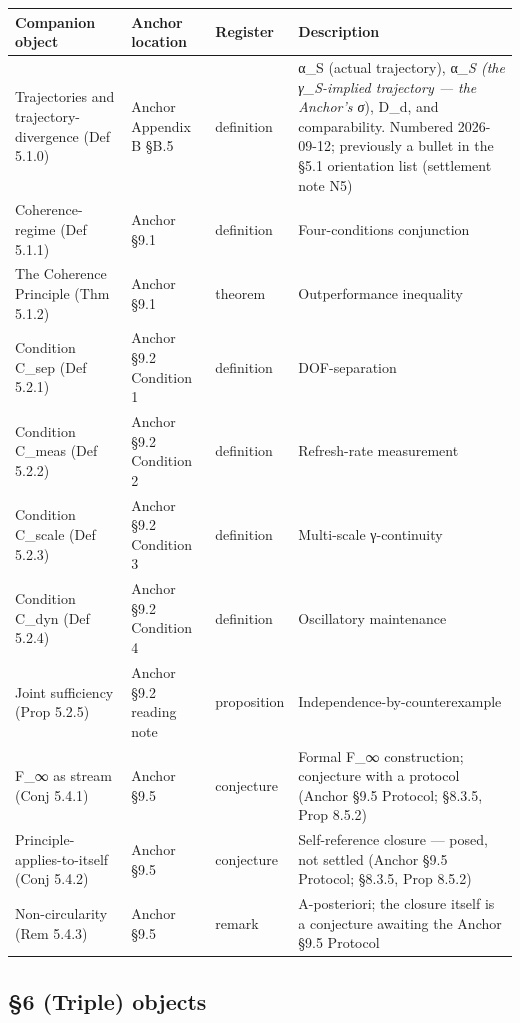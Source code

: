 \documentclass[11pt, openany]{book}
\begin{document}
\begingroup\setlength{\tabcolsep}{3pt}\renewcommand{\arraystretch}{1.15}\footnotesize
\begin{longtable}{p{0.67in} p{0.52in} p{0.52in} p{2.57in}}
\toprule
Companion object & Anchor location & Register & Description \\
\midrule
\endhead
\bottomrule
\endfoot
Trajectories and trajectory-divergence (Def 5.1.0) & Anchor Appendix B §B.5 & definition & α\_\allowbreak{}S (actual trajectory), α\textit{\_\allowbreak{}S (the γ\_\allowbreak{}S-implied trajectory --- the Anchor's σ}), D\_\allowbreak{}d, and comparability. Numbered 2026-09-12; previously a bullet in the §5.1 orientation list (settlement note N5) \\
\midrule
Coherence-regime (Def 5.1.1) & Anchor §9.1 & definition & Four-conditions conjunction \\
\midrule
The Coherence Principle (Thm 5.1.2) & Anchor §9.1 & theorem & Outperformance inequality \\
\midrule
Condition C\_\allowbreak{}sep (Def 5.2.1) & Anchor §9.2 Condition 1 & definition & DOF-separation \\
\midrule
Condition C\_\allowbreak{}meas (Def 5.2.2) & Anchor §9.2 Condition 2 & definition & Refresh-rate measurement \\
\midrule
Condition C\_\allowbreak{}scale (Def 5.2.3) & Anchor §9.2 Condition 3 & definition & Multi-scale γ-continuity \\
\midrule
Condition C\_\allowbreak{}dyn (Def 5.2.4) & Anchor §9.2 Condition 4 & definition & Oscillatory maintenance \\
\midrule
Joint sufficiency (Prop 5.2.5) & Anchor §9.2 reading note & proposition & Independence-by-counterexample \\
\midrule
F\_\allowbreak{}∞ as stream (Conj 5.4.1) & Anchor §9.5 & conjecture & Formal F\_\allowbreak{}∞ construction; conjecture with a protocol (Anchor §9.5 Protocol; §8.3.5, Prop 8.5.2) \\
\midrule
Principle-applies-to-itself (Conj 5.4.2) & Anchor §9.5 & conjecture & Self-reference closure --- posed, not settled (Anchor §9.5 Protocol; §8.3.5, Prop 8.5.2) \\
\midrule
Non-circularity (Rem 5.4.3) & Anchor §9.5 & remark & A-posteriori; the closure itself is a conjecture awaiting the Anchor §9.5 Protocol \\
\bottomrule
\end{longtable}
\endgroup
\subsection{§6 (Triple) objects}
\end{document}
